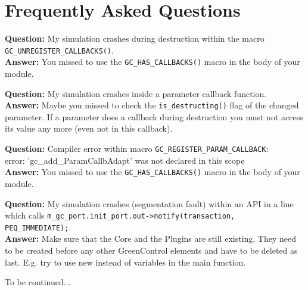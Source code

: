 \newpage
\section{Frequently Asked Questions}
\label{FAQ}

{\bf Question:} My simulation crashes during destruction within the macro \lstinline|GC_UNREGISTER_CALLBACKS()|.\\
{\bf Answer:} You missed to use the \lstinline|GC_HAS_CALLBACKS()| macro in the body of your module.

{\bf Question:} My simulation crashes inside a parameter callback function.\\
{\bf Answer:} Maybe you missed to check the \lstinline|is_destructing()| flag of the changed parameter. If a parameter does a callback during destruction you must not access its value any more (even not in this callback).

{\bf Question:} Compiler error within macro \lstinline|GC_REGISTER_PARAM_CALLBACK|:\\ {\sffamily error: 'gc\_add\_ParamCallbAdapt' was not declared in this scope}\\
{\bf Answer:} You missed to use the \lstinline|GC_HAS_CALLBACKS()| macro in the body of your module.

{\bf Question:} My simulation crashes (segmentation fault) within an API in a line which calls \lstinline|m_gc_port.init_port.out->notify(transaction, PEQ_IMMEDIATE);|. \\
{\bf Answer:} Make sure that the Core and the Plugins are still existing. They need to be created before any other GreenControl elements and have to be deleted as last. E.g. try to use new instead of variables in the main function.

\vspace{3cm}
To be continued...